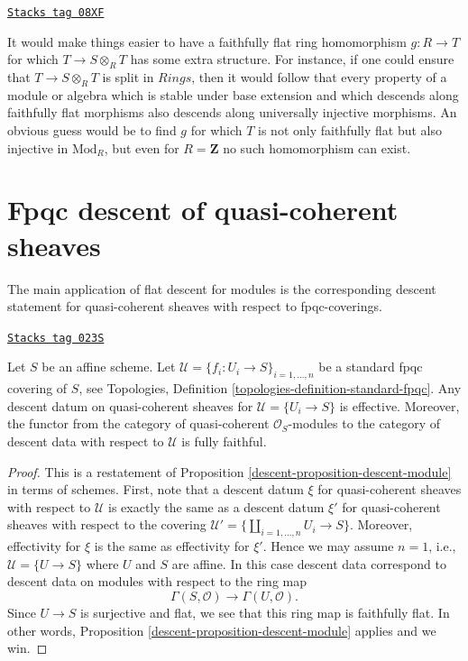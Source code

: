 \begin{remark}
\label{descent-remark-when-locally-split}
\href{https://stacks.math.columbia.edu/tag/08XF}{\texttt{Stacks tag 08XF}}

It would make things easier to have a faithfully
flat ring homomorphism $g: R \to T$ for which $T \to S \otimes_R T$ has some
extra structure.
For instance, if one could ensure that $T \to S \otimes_R T$ is split in
$\textit{Rings}$,
then it would follow that every property of a module or algebra which is stable
under base extension
and which descends along faithfully flat morphisms also descends along
universally injective morphisms.
An obvious guess would be to find $g$ for which $T$ is not only faithfully flat
but also injective in $\text{Mod}_R$,
but even for $R = \mathbf{Z}$ no such homomorphism can exist.
\end{remark}

\section{Fpqc descent of quasi-coherent sheaves}
\label{descent-section-fpqc-descent-quasi-coherent}
The main application of flat descent for modules is
the corresponding descent statement for quasi-coherent
sheaves with respect to fpqc-coverings.

\begin{lemma}
\label{descent-lemma-standard-fpqc-covering}
\href{https://stacks.math.columbia.edu/tag/023S}{\texttt{Stacks tag 023S}}

Let $S$ be an affine scheme.
Let $\mathcal{U} = \{f_i : U_i \to S\}_{i = 1, \ldots, n}$
be a standard fpqc covering of $S$, see
Topologies, Definition \ref{topologies-definition-standard-fpqc}.
Any descent datum on quasi-coherent sheaves
for $\mathcal{U} = \{U_i \to S\}$ is effective.
Moreover, the functor from the category of
quasi-coherent $\mathcal{O}_S$-modules to the category
of descent data with respect to $\mathcal{U}$ is fully faithful.
\end{lemma}

\begin{proof}

This is a restatement of Proposition \ref{descent-proposition-descent-module}
in terms of schemes. First, note that a descent datum $\xi$
for quasi-coherent sheaves with respect to $\mathcal{U}$
is exactly the same as a descent datum $\xi'$ for quasi-coherent sheaves
with respect to the covering
$\mathcal{U}' = \{\coprod_{i = 1, \ldots, n} U_i \to S\}$.
Moreover, effectivity for $\xi$ is the same as effectivity for $\xi'$.
Hence we may assume $n = 1$, i.e., $\mathcal{U} = \{U \to S\}$
where $U$ and $S$ are affine. In this case descent data
correspond to descent data on modules with respect to the ring map
$$
\Gamma(S, \mathcal{O})
\longrightarrow
\Gamma(U, \mathcal{O}).
$$
Since $U \to S$ is surjective and flat, we see that this ring map
is faithfully flat. In other words,
Proposition \ref{descent-proposition-descent-module} applies and we win.
\end{proof}

